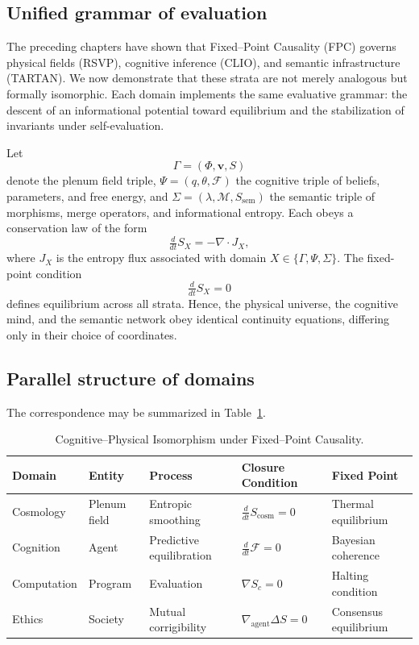 \documentclass[12pt,a4paper]{article}
\newcommand{\RSVP}{RSVP}              %
\newcommand{\CLIO}{CLIO}              %
\newcommand{\ddt}{\tfrac{d}{dt}}      %
\theoremstyle{plain}
\begin{document}
\subsection{Unified grammar of evaluation}
The preceding chapters have shown that Fixed--Point Causality (FPC) governs 
physical fields (\RSVP), cognitive inference (\CLIO), and semantic infrastructure (TARTAN).  
We now demonstrate that these strata are not merely analogous but formally isomorphic.
Each domain implements the same evaluative grammar:
the descent of an informational potential toward equilibrium and the stabilization of invariants under self-evaluation.

Let 
\[
\Gamma = (\Phi,\mathbf{v},S)
\]
denote the plenum field triple,
\(\Psi=(q,\theta,\mathcal{F})\) the cognitive triple of beliefs, parameters, and free energy,
and 
\(\Sigma=(\lambda,\mathcal{M},S_\text{sem})\) the semantic triple of morphisms, merge operators, and informational entropy.
Each obeys a conservation law of the form
\[
\ddt S_X = -\nabla \cdot J_X,
\]
where \(J_X\) is the entropy flux associated with domain \(X\in\{\Gamma,\Psi,\Sigma\}\).
The fixed-point condition
\[
\ddt S_X = 0
\]
defines equilibrium across all strata.  
Hence, the physical universe, the cognitive mind, and the semantic network
obey identical continuity equations, differing only in their choice of coordinates.

\subsection{Parallel structure of domains}
The correspondence may be summarized in Table~\ref{tab:isomorphism}.

\begin{table}[H]
\centering
\caption{Cognitive--Physical Isomorphism under Fixed--Point Causality.}
\label{tab:isomorphism}
\begin{tabular}{@{}lllll@{}}
\toprule
\textbf{Domain} & \textbf{Entity} & \textbf{Process} & \textbf{Closure Condition} & \textbf{Fixed Point} \\
\midrule
Cosmology & Plenum field & Entropic smoothing & $\ddt S_{\text{cosm}}=0$ & Thermal equilibrium \\
Cognition & Agent & Predictive equilibration & $\ddt \mathcal{F}=0$ & Bayesian coherence \\
Computation & Program & Evaluation & $\nabla S_c=0$ & Halting condition \\
Ethics & Society & Mutual corrigibility & $\nabla_\text{agent} \Delta S=0$ & Consensus equilibrium \\
\bottomrule
\end{tabular}
\end{table}
\end{document}
